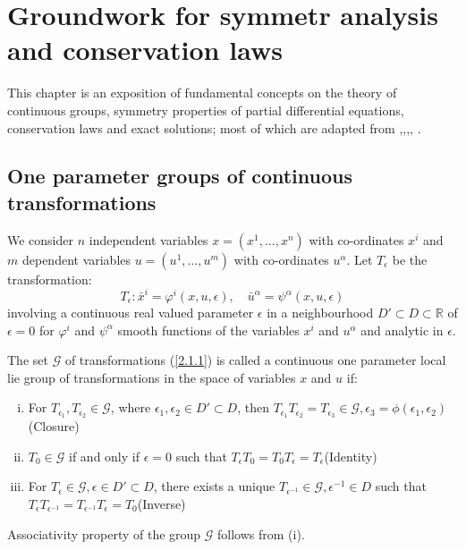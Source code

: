 \chapter{Groundwork for symmetr analysis and conservation laws}
This chapter is an exposition of fundamental concepts on  the theory of continuous groups, symmetry properties of partial  differential equations, conservation laws and exact solutions;  most of which  are adapted from \cite{ibragimov2009practical},\cite{bluman2013symmetries},\cite{bluman2008symmetry},\cite{olver2000applications},\cite{ovsyannikov2013lectures} \citep{arrigo2015symmetry}.
\section{One parameter groups of continuous transformations}
We consider $n$ independent variables $ x= ( x^1, \ldots, x^n ) $  with co-ordinates $ x^i$ and   $m$ dependent variables $ u= ( u^1, \ldots, u^m ) $ with co-ordinates $ u^{\alpha}$. Let $ T_{\epsilon}$ be the transformation:
\begin{equation}
T_{\epsilon}:\bar{x}^i = \varphi^i(x,u,\epsilon ), \quad \bar{u}^{\alpha } =\psi^{\alpha}(x,u,\epsilon) \label{2.1.1}
\end{equation} involving  a continuous real valued parameter $\epsilon$ in a neighbourhood $ D' \subset D \subset \mathbb{R}$ of $ \epsilon=0 $ for   $ \varphi^i$ and $ \psi^{\alpha}$ smooth functions of the variables $x^i$ and $u^{\alpha}$ and analytic in $\epsilon$.
\begin{defn} The set $\mathcal{G}$  of transformations (\ref{2.1.1}) is called a continuous one parameter local lie group of transformations in the space of variables $x$ and $u$ if:
	\begin{enumerate}[(i)]
		\item For $T_{\epsilon_1},T_{\epsilon_2}  \in \mathcal{G}$, where $\epsilon_1,\epsilon_2 \in  D' \subset D $, then $T_{\epsilon_1}T_{\epsilon_2} = T_{\epsilon_3} \in \mathcal{G}, \epsilon_3= \phi( \epsilon_1,\epsilon_2)$	(Closure)	
		\item $  T_0 \in \mathcal{G} $ if and only if $ \epsilon=0$ such that $ T_{\epsilon}T_{0}=T_{0}T_{\epsilon}=T_{\epsilon}$(Identity)
		\item For $ T_{\epsilon} \in \mathcal{G}, \epsilon\in  D' \subset D$, there exists a unique $ T_{\epsilon^{-1}} \in \mathcal{G}, \epsilon^{-1} \in D $
		such that $ T_{\epsilon} T_{\epsilon^{-1}} =T_{\epsilon^{-1}}T_{\epsilon}=T_{0}$(Inverse)
	\end{enumerate}

\begin{rem}
 Associativity property of the group $\mathcal{G} $ follows from (i). \label{2.1}
\end{rem}
\end{defn}
